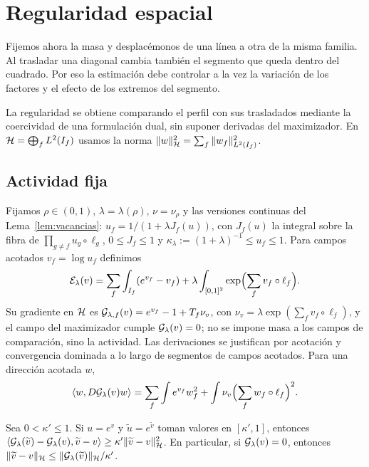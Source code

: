 \section{Regularidad espacial}\label{sec:regularidad}

Fijemos ahora la masa y desplacémonos de una línea a otra de la misma familia.
Al trasladar una diagonal cambia también el segmento que queda dentro del cuadrado.
Por eso la estimación debe controlar a la vez la variación de los factores y
el efecto de los extremos del segmento.

La regularidad se obtiene comparando el perfil con sus trasladados mediante la coercividad de una
formulación dual, sin suponer derivadas del maximizador. En ${\mathcal{H}}=\bigoplus_fL^2(I_f)$ usamos la
norma $\|w\|_{\mathcal{H}}^2=\sum_f\|w_f\|_{L^2(I_f)}^2$.

\subsection{Actividad fija}

Fijamos $\rho\in(0,1)$, $\lambda=\lambda(\rho)$, $\nu=\nu_\rho$ y las versiones continuas del
Lema~\ref{lem:vacancias}: $u_f=1/(1+\lambda J_f(u))$, con $J_f(u)$ la integral sobre la fibra de
$\prod_{g\ne f}u_g\circ\ell_g$, $0\le J_f\le1$ y $\kappa_\lambda:=(1+\lambda)^{-1}\le u_f\le1$. Para
campos acotados $v_f=\log u_f$ definimos
\begin{equation}\label{eq:dual}
 {\mathcal{E}}_\lambda(v)=\sum_f\int_{I_f}(e^{v_f}-v_f)+\lambda\int_{[0,1]^2}\exp\Bigl(\sum_fv_f\circ\ell_f\Bigr).
\end{equation}
Su gradiente en ${\mathcal{H}}$ es ${\mathcal{G}}_{\lambda,f}(v)=e^{v_f}-1+T_f\nu_v$, con
$\nu_v=\lambda\exp(\sum_fv_f\circ\ell_f)$, y el campo del maximizador cumple ${\mathcal{G}}_\lambda(v)=0$; no se
impone masa a los campos de comparación, sino la actividad. Las derivaciones se justifican por
acotación y convergencia dominada a lo largo de segmentos de campos acotados. Para una dirección
acotada $w$,
\begin{equation}\label{eq:hess}
 \langle w,D{\mathcal{G}}_\lambda(v)w\rangle=\sum_f\int e^{v_f}w_f^2+\int\nu_v\Bigl(\sum_fw_f\circ\ell_f\Bigr)^2 .
\end{equation}

\begin{lema}[Estabilidad]\label{lem:estabilidad}
Sea $0<\kappa'\le1$. Si $u=e^v$ y $\widetilde u=e^{\widetilde v}$ toman valores en $[\kappa',1]$,
entonces $\langle{\mathcal{G}}_\lambda(\widetilde v)-{\mathcal{G}}_\lambda(v),\widetilde v-v\rangle\ge\kappa'\|\widetilde v-v\|_{\mathcal{H}}^2$.
En particular, si ${\mathcal{G}}_\lambda(v)=0$, entonces
$\|\widetilde v-v\|_{\mathcal{H}}\le\|{\mathcal{G}}_\lambda(\widetilde v)\|_{\mathcal{H}}/\kappa'$.
\end{lema}

